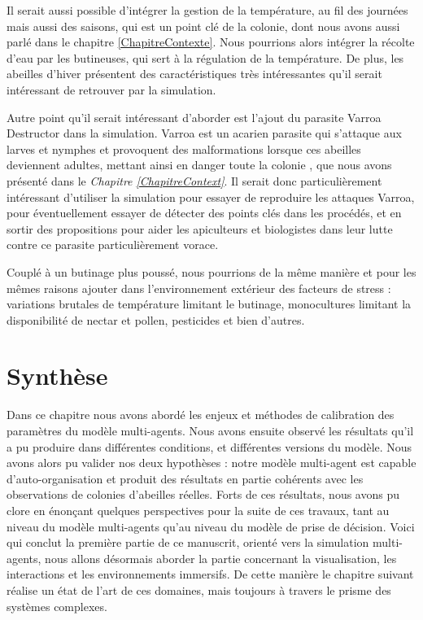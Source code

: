 	Il serait aussi possible d'intégrer la gestion de la température, au fil des journées mais aussi des saisons, qui est un point clé de la colonie, dont nous avons aussi parlé dans le chapitre \ref{ChapitreContexte}. Nous pourrions alors intégrer la récolte d'eau par les butineuses, qui sert à la régulation de la température. De plus, les abeilles d'hiver présentent des caractéristiques très intéressantes qu'il serait intéressant de retrouver par la simulation. 
	
	Autre point qu'il serait intéressant d'aborder est l'ajout du parasite Varroa Destructor dans la simulation. Varroa est un acarien parasite qui s'attaque aux larves et nymphes et provoquent des malformations lorsque ces abeilles deviennent adultes, mettant ainsi en danger toute la colonie \cite{le_conte_varroa_2010}, que nous avons présenté dans le \textit{Chapitre \ref{ChapitreContext}}. Il serait donc particulièrement intéressant d'utiliser la simulation pour essayer de reproduire les attaques Varroa, pour éventuellement essayer de détecter des points clés dans les procédés, et en sortir des propositions pour aider les apiculteurs et biologistes dans leur lutte contre ce parasite particulièrement vorace.
	
	Couplé à un butinage plus poussé, nous pourrions de la même manière et pour les mêmes raisons ajouter dans l'environnement extérieur des facteurs de stress : variations brutales de température limitant le butinage, monocultures limitant la disponibilité de nectar et pollen, pesticides et bien d'autres.
	
	
			
	\section*{Synthèse}
	Dans ce chapitre nous avons abordé les enjeux et méthodes de calibration des paramètres du modèle multi-agents. Nous avons ensuite observé les résultats qu'il a pu produire dans différentes conditions, et différentes versions du modèle. Nous avons alors pu valider nos deux hypothèses : notre modèle multi-agent est capable d'auto-organisation et produit des résultats en partie cohérents avec les observations de colonies d'abeilles réelles. Forts de ces résultats, nous avons pu clore en énonçant quelques perspectives pour la suite de ces travaux, tant au niveau du modèle multi-agents qu'au niveau du modèle de prise de décision. Voici qui conclut la première partie de ce manuscrit, orienté vers la simulation multi-agents, nous allons désormais aborder la partie concernant la visualisation, les interactions et les environnements immersifs. De cette manière le chapitre suivant réalise un état de l'art de ces domaines, mais toujours à travers le prisme des systèmes complexes.
